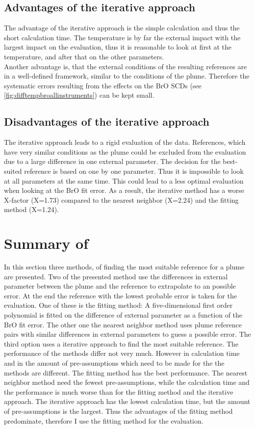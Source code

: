\documentclass  [
  paper    = a4,
  BCOR     = 10mm,
  twoside,
  fontsize = 12pt,
  fleqn,
  toc      = bibnumbered,
  toc      = listofnumbered,
  numbers  = noendperiod,
  headings = normal,
  listof   = leveldown,
  version  = 3.03
]                                       {scrreprt}
\begin{document}
\subsection*{Advantages of the iterative approach}
The advantage of the iterative approach is the simple calculation and thus the short calculation time. The temperature is by far the external impact with the largest impact on the evaluation, thus it is reasonable to look at first at the temperature, and after that on the other parameters. \\
Another advantage is, that the external conditions of the resulting references are in a well-defined framework, similar to the conditions of the plume. Therefore the systematic errors resulting from the effects on the BrO SCDs (see \cref{fig:difftempbroallinstruments}) can be kept small.
\subsection*{Disadvantages of the iterative approach}
The iterative approach leads to a rigid evaluation of the data. References, which have very similar conditions as the plume could be excluded from the evaluation due to a large difference in one external parameter. The decision for the best-suited reference is based on one by one parameter. Thus it is impossible to look at all parameters at the same time.   This could lead to a less optimal evaluation when looking at the BrO fit error.
As a result, the iterative method has a worse X-factor (X=1.73) compared to the nearest neighbor (X=2.24) and the fitting method (X=1.24).


\section*{Summary of }    
In this section three methods, of finding the most suitable reference for a plume are presented.
Two of the presented method use the differences in external parameter between the plume and the reference to extrapolate to an possible error. At the end the reference with the lowest probable error is taken for the evaluation. One of these is the fitting method: A five-dimensional first order polynomial is fitted on the difference of external parameter as a function of the BrO fit error. The other one the nearest neighbor method uses plume reference pairs with similar differences in external parameters to guess a possible error. The third option uses a iterative approach to find the most suitable reference. The performance of the methods differ not very much. However in calculation time and in the amount of pre-assumptions which need to be made for the the methods are different. The fitting method has the best performance. The nearest neighbor method need the fewest pre-assumptions, while the calculation time and the performance is much worse than for the fitting method and the iterative approach. The iterative approach has the lowest calculation time, but the amount of pre-assumptions is the largest. Thus the advantages of the fitting method predominate, therefore I use the fitting method for the evaluation.
\end{document}
